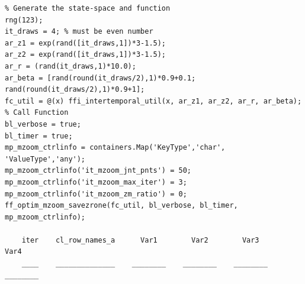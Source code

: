 \documentclass[
]{book}
\begin{document}
\begin{verbatim}
% Generate the state-space and function
rng(123);
it_draws = 4; % must be even number
ar_z1 = exp(rand([it_draws,1])*3-1.5);
ar_z2 = exp(rand([it_draws,1])*3-1.5);
ar_r = (rand(it_draws,1)*10.0);
ar_beta = [rand(round(it_draws/2),1)*0.9+0.1; rand(round(it_draws/2),1)*0.9+1]; 
fc_util = @(x) ffi_intertemporal_util(x, ar_z1, ar_z2, ar_r, ar_beta);
% Call Function
bl_verbose = true;
bl_timer = true;
mp_mzoom_ctrlinfo = containers.Map('KeyType','char', 'ValueType','any');
mp_mzoom_ctrlinfo('it_mzoom_jnt_pnts') = 50;
mp_mzoom_ctrlinfo('it_mzoom_max_iter') = 3;
mp_mzoom_ctrlinfo('it_mzoom_zm_ratio') = 0;
ff_optim_mzoom_savezrone(fc_util, bl_verbose, bl_timer, mp_mzoom_ctrlinfo);

    iter    cl_row_names_a      Var1        Var2        Var3        Var4  
    ____    ______________    ________    ________    ________    ________


\end{verbatim}
\end{document}
